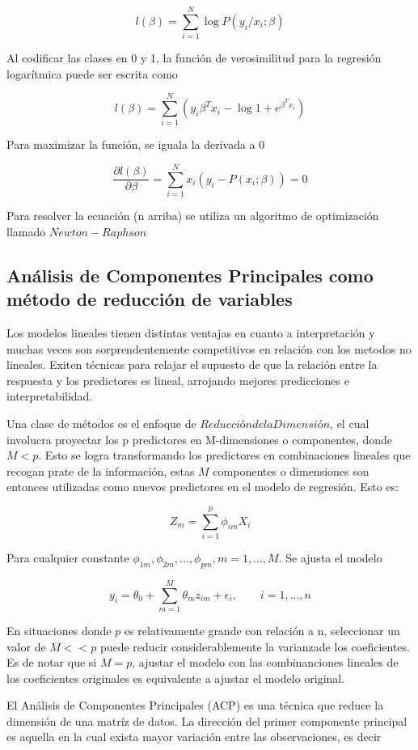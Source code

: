 \documentclass[a4paper,12pt]{Latex/Classes/PhDthesisPSnPDF}
\begin{document}
$$ l(\beta) = \sum_{i=1}^{N} \log{P(y_{i}/ x_{i}; \beta)} $$

Al codificar las clases en 0 y 1, la función de verosimilitud para la regresión logarítmica puede ser escrita como

$$ l(\beta) = \sum_{i=1}^{N}(y_{i}\beta^{T}x_{i} - \log{1 + e^{\beta^{T}x_{i}}}) $$

Para maximizar la función, se iguala la derivada a 0

$$ \frac{\partial l(\beta)}{\partial \beta} = \sum_{i=1}^{N}x_{i}(y_{i} - P(x_{i}; \beta)) = 0 $$

Para resolver la ecuación (n arriba) se utiliza un algoritmo de optimización llamado $Newton-Raphson$

\subsection{Análisis de Componentes Principales como método de reducción de variables}

Los modelos lineales tienen distintas ventajas en cuanto a interpretación y muchas veces son sorprendentemente competitivos en relación con los metodos no lineales. Exiten técnicas para relajar el supuesto de  que la relación entre la respuesta y los predictores es lineal, arrojando mejores predicciones e interpretabilidad. 

Una clase de métodos es el enfoque de $Reducción de la Dimensión$, el cual involucra proyectar los p predictores en M-dimensiones o componentes, donde $M < p$. Esto se logra transformando los predictores en combinaciones lineales que recogan prate de la información, estas $M$ componentes o dimensiones son entonces utilizadas como nuevos predictores en el modelo de regresión. Esto es:

$$ Z_{m} = \sum_{i = 1}^{p} \phi_{im}X_{i} $$

Para cualquier constante $ \phi_{1m}, \phi_{2m}, ..., \phi_{pm}, m = 1, ..., M $. Se ajusta el modelo

$$ y_{i} = \theta_{0} + \sum_{m = 1}^{M} \theta_{m}z_{im} + \epsilon_{i},  \qquad i = 1, ..., n $$

En situaciones donde $p$ es relativamente grande con relación a n, seleccionar un valor de $M << p$ puede reducir considerablemente la varianzade los coeficientes. Es de notar que si $M = p$, ajustar el modelo con las combinanciones lineales de los coeficientes originales es equivalente a ajustar el modelo original.

El Análisis de Componentes Principales (ACP) es una técnica que reduce la dimensión de una matríz de datos. La dirección del primer componente principal es aquella en la cual exista mayor variación entre las observaciones, es decir
\end{document}
